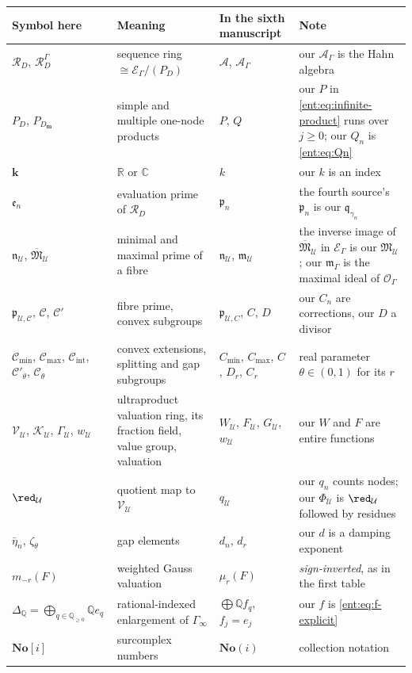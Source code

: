 \documentclass[11pt]{article}
\theoremstyle{plain}
\theoremstyle{plain}
\theoremstyle{plain}
\theoremstyle{definition}
\theoremstyle{definition}
\theoremstyle{definition}
\theoremstyle{definition}
\theoremstyle{remark}
\newcommand{\C}{\mathbb C}\newcommand{\R}{\mathbb R}
\newcommand{\Q}{\mathbb Q}\newcommand{\Z}{\mathbb Z}\newcommand{\N}{\mathbb N}
\newcommand{\No}{\mathbf{No}}
\newcommand{\E}{\mathcal E_\Gamma}
\newcommand{\A}{\mathcal A_\Gamma}\newcommand{\OO}{\mathcal O_\Gamma}
\newcommand{\RD}{\mathcal R_D}\newcommand{\Ucal}{\mathcal U}
\newcommand{\kk}{\mathbf k}\newcommand{\PP}{\mathbb P}
\begin{document}
\begin{center}\small
\begin{tabularx}{\textwidth}{@{}P{0.2\textwidth}P{0.3\textwidth}P{0.17\textwidth}Y@{}}
\toprule
Symbol here & Meaning & In the sixth manuscript & Note\\\midrule
$\RD$, $\RD^\Gamma$ & sequence ring $\cong\mathcal E_\Gamma/(P_D)$ &
$\mathcal A$, $\mathcal A_\Gamma$ & our $\A$ is the Hahn algebra\\[0.3em]
$P_D$, $P_{D_{\mathbf m}}$ & simple and multiple one-node products & $P$,
$Q$ & our $P$ in \eqref{ent:eq:infinite-product} runs over $j\ge0$; our $Q_n$
is \eqref{ent:eq:Qn}\\[0.3em]
$\kk$ & $\R$ or $\C$ & $k$ & our $k$ is an index\\[0.3em]
$\mathfrak e_n$ & evaluation prime of $\RD$ & $\mathfrak p_n$ & the fourth
source's $\mathfrak p_n$ is our $\mathfrak q_{\gamma_n}$\\[0.3em]
$\mathfrak n_\Ucal$, $\overline{\mathfrak M}_\Ucal$ & minimal and maximal
prime of a fibre & $\mathfrak n_\Ucal$, $\mathfrak m_\Ucal$ & the inverse
image of $\overline{\mathfrak M}_\Ucal$ in $\E$ is our $\mathfrak M_\Ucal$;
our $\mathfrak m_\Gamma$ is the maximal ideal of $\OO$\\[0.3em]
$\mathfrak p_{\Ucal,\mathcal C}$, $\mathcal C$, $\mathcal C'$ & fibre prime,
convex subgroups & $\mathfrak p_{\Ucal,C}$, $C$, $D$ & our $C_n$ are
corrections, our $D$ a divisor\\[0.3em]
$\mathcal C_{\min}$, $\mathcal C_{\max}$, $\mathcal C_{\mathrm{int}}$,
$\mathcal C'_\theta$, $\mathcal C_\theta$ & convex extensions, splitting and
gap subgroups & $C_{\min}$, $C_{\max}$, $C$, $D_r$, $C_r$ & real parameter
$\theta\in(0,1)$ for its $r$\\[0.3em]
$\mathcal V_\Ucal$, $\mathcal K_\Ucal$, $\Gamma_\Ucal$, $w_\Ucal$ &
ultraproduct valuation ring, its fraction field, value group, valuation &
$W_\Ucal$, $F_\Ucal$, $G_\Ucal$, $w_\Ucal$ & our $W$ and $F$ are entire
functions\\[0.3em]
$\red_\Ucal$ & quotient map to $\mathcal V_\Ucal$ & $q_\Ucal$ & our $q_n$
counts nodes; our $\Phi_\Ucal$ is $\red_\Ucal$ followed by residues\\[0.3em]
$\bar\eta_n$, $\zeta_\theta$ & gap elements & $d_n$, $d_r$ & our $d$ is a
damping exponent\\[0.3em]
$m_{-r}(F)$ & weighted Gauss valuation & $\mu_r(F)$ & \emph{sign-inverted},
as in the first table\\[0.3em]
$\Delta_\Q=\bigoplus_{q\in\Q_{\ge0}}\Q e_q$ & rational-indexed
enlargement of $\Gamma_\infty$ & $\bigoplus\Q f_q$, $f_j=e_j$ & our $f$ is
\eqref{ent:eq:f-explicit}\\[0.3em]
$\No[i]$ & surcomplex numbers & $\No(i)$ & collection notation\\
\bottomrule
\end{tabularx}
\end{center}
\end{document}
